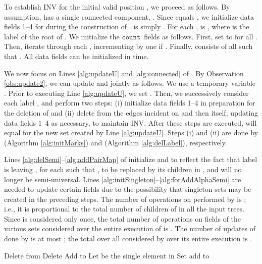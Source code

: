 \documentclass[11pt]{article}
\newcommand{\InitLists}{\ensuremath{\texttt{Initialize}}}
\newcommand{\cnt}{\ensuremath{\mathtt{count}}} \newcommand{\ID}{\ensuremath{\mathtt{id}}} \newcommand{\TYPE}{\ensuremath{\mathtt{in}}} \newcommand{\SIZE}{\ensuremath{\mathtt{size}}} \newcommand{\COUNT}{\ensuremath{\mathtt{count}}} \newcommand{\SET}{\ensuremath{\mathtt{set}}} \newcommand{\SEMI}{\ensuremath{\mathtt{semiU}}} \newcommand{\LABEL}{\ensuremath{\mathtt{label}}} \newcommand{\WEIGHT}{\ensuremath{\mathtt{weight}}} \newcommand{\NULL}{\ensuremath{\mathtt{null}}} \newcommand{\MAP}{\ensuremath{\mathtt{map}}} \newcommand{\KEY}{\ensuremath{\mathtt{key}}} \newcommand{\VALUE}{\ensuremath{\mathtt{value}}} \newcommand{\KEYSET}{\ensuremath{\mathtt{keySet}}}
\theoremstyle{definition}
\begin{document}
To establish INV for the initial valid position , we proceed as follows.  By assumption,  has a single connected component, .  
Since  equals , we initialize data fields 1--4 for  during the construction of . 
 is simply . For each ,  is , where  is the label of the root of .  We initialize the \cnt\ fields as follows.  
First, set  to  for all .  Then,  iterate through each , incrementing  by one if .  Finally,  consists of all  such that .  All data fields can be initialized in  time.


We now focus on Lines \ref{alg:updateU} and \ref{alg:connected} of . By Observation \ref{obs:update2}, we can update  and  jointly as follows. We use a temporary variable .  Prior to executing Line \ref{alg:updateU}, we set .
Then, we successively consider each label , and perform two steps: (i) initialize data fields 1--4 in preparation for the deletion of  and (ii) delete from  the edges incident on  and then  itself, updating data fields 1--4 as necessary, to maintain INV.  After these steps are executed,  will equal  for the new set  created by Line \ref{alg:updateU}.  Steps (i) and (ii) are done by  (Algorithm \ref{alg:initMarks}) and  (Algorithm \ref{alg:delLabel}), respectively. 

Lines \ref{alg:delSemi}--\ref{alg:addPairMap} of  initialize  and  to reflect the fact that label  is leaving , for each  such that , to be replaced by its children in , and will no longer be semi-universal.  Lines \ref{alg:initSingleton}--\ref{alg:forAddAlphaSemi} are needed to update certain  fields due to the possibility that singleton sets  may be created in the preceding steps.  The number of operations on  performed by  is ; i.e., it is proportional to the total number of children of  in all the input trees.  Since  is considered only once, the total number of operations on  fields of the various sets  considered over the entire execution of  is .  The number of updates of  done by  is at most ; the total over all  considered by  over its entire execution is .

\begin{algorithm}\SetAlgoLined\SetNoFillComment

\DontPrintSemicolon
Delete  from  \label{alg:delSemi}\;
	{
		Delete  \;
		\ForEach {\label{alg:forEachAlpha}}
		{
			Add  to  \label{alg:addPairMap} \; 
		}
		{
			Let  be the single element in  \;
			Set  \;
			\lIf{}
			{
				add  to \label{alg:forAddAlphaSemi}
			}
		}
	}

\caption{\InitLists}\label{alg:initMarks}
\end{algorithm}
\end{document}
